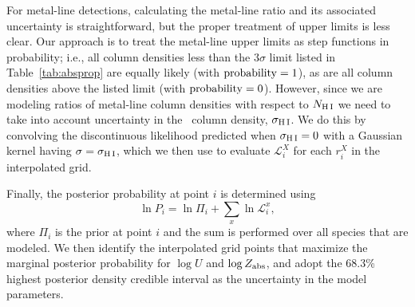 \documentclass[twocolumn,twocolappendix,tighten,times]{aastex6}
\newcommand{\HI}{\ion{H}{1}}
\begin{document}
For metal-line detections, calculating the metal-line ratio and its associated 
uncertainty is straightforward, but the proper treatment of upper limits is less 
clear. Our approach is to treat the metal-line upper limits as step functions in 
probability; i.e., all column densities less than the $3\sigma$ limit listed 
in Table~\ref{tab:absprop} are equally likely (with $\rm{probability}=1$), as 
are all column densities above the listed limit (with $\rm{probability}=0$). 
However, since we are modeling ratios of metal-line column densities with 
respect to $N_{\rm H\,I}$ we need to take into account uncertainty in the 
\HI\ column density, $\sigma_{\rm H\,I}$. We do this by convolving the 
discontinuous likelihood predicted when $\sigma_{\rm H\,I}=0$ with a Gaussian 
kernel having $\sigma = \sigma_{\rm H\,I}$, which we then use to evaluate $\mathcal{L}^X_i$ for each $r^X_i$ in the interpolated grid. 

Finally, the posterior probability at point $i$ is determined using
\begin{equation}
\ln{P_i} = \ln{\Pi_i} + \sum_x \ln{\mathcal{L}^x_i},
\end{equation}
where $\Pi_i$ is the prior at point $i$ and the sum is performed over all 
species that are modeled. We then identify the interpolated grid points that 
maximize the marginal posterior probability for $\log{U}$ and 
$\log{Z_{\rm abs}}$, and adopt the 68.3\% highest posterior density 
credible interval as the uncertainty in the model parameters.
\end{document}
